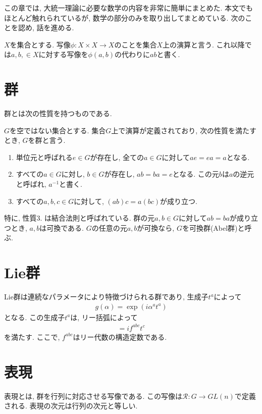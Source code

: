 %
%
この章では, 大統一理論に必要な数学の内容を非常に簡単にまとめた.
本文でもほとんど触れられているが, 数学の部分のみを取り出してまとめている.
次のことを認め, 話を進める.

$X$を集合とする.
写像$\phi: X\times X \rightarrow X$のことを集合$X$上の演算と言う.
これ以降では$a,b,\in X$に対する写像を$\phi(a, b)$の代わりに$ab$と書く.
\section{群}
群とは次の性質を持つものである.
\begin{dfn}[群]
  $G$を空ではない集合とする. 集合$G$上で演算が定義されており, 次の性質を満たすとき, $G$を群と言う.
  \begin{enumerate}
    \item 単位元と呼ばれる$e\in G$が存在し, 全ての$a\in G$に対して$ae=ea=a$となる.
    \item すべての$a\in G$に対し, $b\in G$が存在し, $ab=ba=e$となる. この元$b$は$a$の逆元と呼ばれ, $a^{-1}$と書く.
    \item すべての$a, b, c \in G$に対して, $(ab)c=a(bc)$が成り立つ.
  \end{enumerate}
\end{dfn}
特に, 性質3. は結合法則と呼ばれている.
群の元$a, b\in G$に対して$ab=ba$が成り立つとき, $a, b$は可換である.
$G$の任意の元$a, b$が可換なら, $G$を可換群(Abel群)と呼ぶ.
\section{Lie群}
Lie群は連続なパラメータにより特徴づけられる群であり, 生成子$t^a$によって
\begin{align}
  g(\alpha) = \exp(i\alpha^a t^a)
\end{align}
となる.
この生成子$t^a$は, リー括弧によって
\begin{align}
  [t^a, t^b] = if^{abc}t^c
\end{align}
を満たす.
ここで, $f^{abc}$はリー代数の構造定数である.
\section{表現}
表現とは, 群を行列に対応させる写像である.
この写像は$\mathcal{R}: G\rightarrow GL(n)$で定義される.
表現の次元は行列の次元と等しい.



